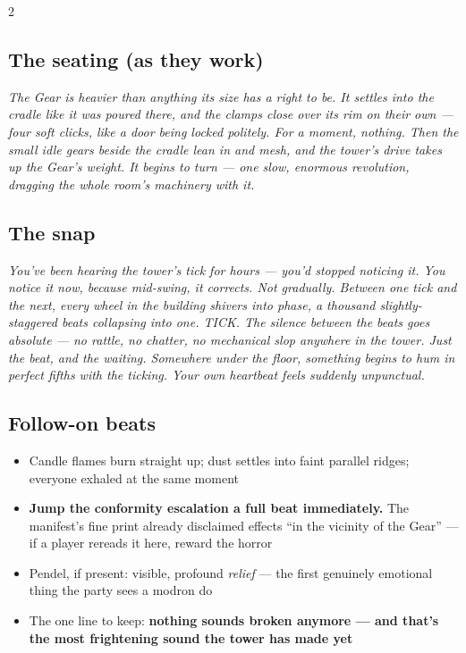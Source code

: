 \documentclass[10pt,letterpaper]{article}
\begin{document}
\begin{multicols}{2}
\subsection*{The seating (as they work)}
\begin{readaloud}
\itshape
The Gear is heavier than anything its size has a right to be. It settles into the cradle like it was poured there, and the clamps close over its rim on their own --- four soft clicks, like a door being locked politely. For a moment, nothing. Then the small idle gears beside the cradle lean in and mesh, and the tower's drive takes up the Gear's weight. It begins to turn --- one slow, enormous revolution, dragging the whole room's machinery with it.
\end{readaloud}

\subsection*{The snap}
\begin{readaloud}
\itshape
You've been hearing the tower's tick for hours --- you'd stopped noticing it. You notice it now, because mid-swing, it corrects. Not gradually. Between one tick and the next, every wheel in the building shivers into phase, a thousand slightly-staggered beats collapsing into one. TICK. The silence between the beats goes absolute --- no rattle, no chatter, no mechanical slop anywhere in the tower. Just the beat, and the waiting. Somewhere under the floor, something begins to hum in perfect fifths with the ticking. Your own heartbeat feels suddenly unpunctual.
\end{readaloud}

\subsection*{Follow-on beats}
\begin{itemize}
\item Candle flames burn straight up; dust settles into faint parallel ridges; everyone exhaled at the same moment
\item \textbf{Jump the conformity escalation a full beat immediately.} The manifest's fine print already disclaimed effects ``in the vicinity of the Gear'' --- if a player rereads it here, reward the horror
\item Pendel, if present: visible, profound \textit{relief} --- the first genuinely emotional thing the party sees a modron do
\item The one line to keep: \textbf{nothing sounds broken anymore --- and that's the most frightening sound the tower has made yet}
\end{itemize}


\end{multicols}
\end{document}
